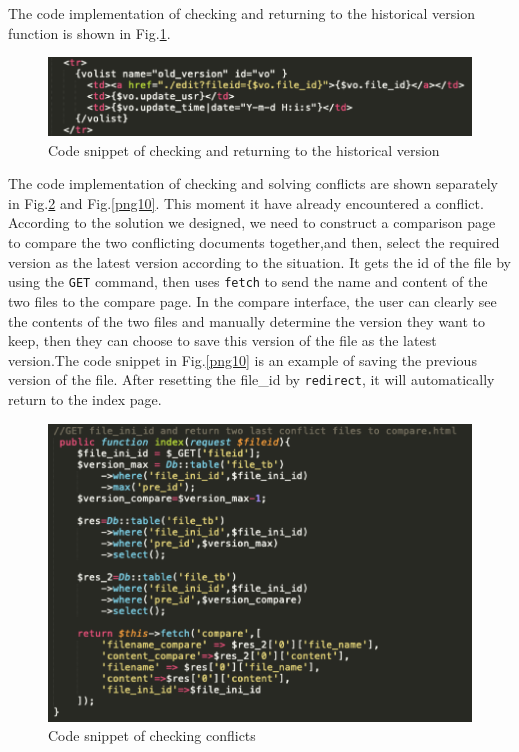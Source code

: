 \noindent The code implementation of checking and returning to the historical version function is shown in Fig.\ref{png8}.
\begin{figure}[H]
  \centering
  \includegraphics[width=.8\textwidth]{changeback.png} %
  \caption{Code snippet of checking and returning to the historical version} %
  \label{png8} %
\end{figure}


\noindent The code implementation of checking and solving conflicts are shown separately in Fig.\ref{png9} and Fig.\ref{png10}. This moment it have already encountered a conflict. According to the solution we designed, we need to construct a comparison page to compare the two conflicting documents together,and then, select the required version as the latest version according to the situation.
\noindent It gets the id of the file by using the \texttt{GET} command, then uses \texttt{fetch} to send the name and content of the two files to the compare page.
\noindent In the compare interface, the user can clearly see the contents of the two files and manually determine the version they want to keep, then they can choose to save this version of the file as the latest version.The code snippet in Fig.\ref{png10} is an example of saving the previous version of the file. After resetting the file\_id by \texttt{redirect}, it will automatically return to the index page.
\begin{figure}[H]
  \centering
  \includegraphics[width=.8\textwidth]{conflict.png}%
  \caption{Code snippet of checking conflicts} %
  \label{png9} %
\end{figure}

